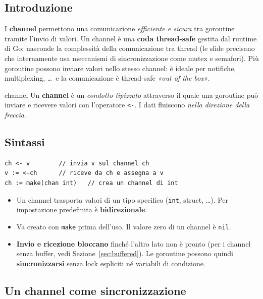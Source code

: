 \documentclass[11pt,a4paper]{report}
\newcommand{\cod}[1]{\texttt{#1}}
\begin{document}
\subsection{Introduzione}

I \textbf{channel} permettono una comunicazione \emph{efficiente e sicura}
tra goroutine tramite l'invio di valori. Un channel è una \textbf{coda
thread-safe} gestita dal runtime di Go; nasconde la complessità della
comunicazione tra thread (le slide precisano che internamente usa
meccanismi di sincronizzazione come mutex e semafori). Più goroutine possono inviare
valori nello stesso channel: è ideale per notifiche, multiplexing, \ldots\ e la
comunicazione è thread-safe \emph{«out of the box»}.

\begin{definizione}{channel}
Un \textbf{channel} è un \emph{condotto tipizzato} attraverso il quale una
goroutine può inviare e ricevere valori con l'operatore \cod{<-}. I dati fluiscono
\emph{nella direzione della freccia}.
\end{definizione}

\subsection{Sintassi}

\begin{lstlisting}[style=gocode,numbers=none]
ch <- v        // invia v sul channel ch
v := <-ch      // riceve da ch e assegna a v
ch := make(chan int)   // crea un channel di int
\end{lstlisting}

\begin{itemize}
  \item Un channel trasporta valori di un tipo specifico (\cod{int}, struct,
        \ldots). Per impostazione predefinita è \textbf{bidirezionale}.
  \item Va creato con \cod{make} prima dell'uso. Il valore zero di un channel è
        \cod{nil}.
  \item \textbf{Invio e ricezione bloccano} finché l'altro lato non è pronto
        (per i channel senza buffer, vedi Sezione~\ref{sec:buffered}). Le
        goroutine possono quindi \textbf{sincronizzarsi} senza lock espliciti né
        variabili di condizione.
\end{itemize}

\subsection{Un channel come sincronizzazione}
\end{document}
